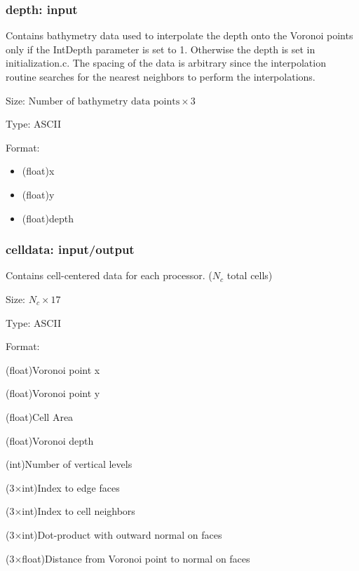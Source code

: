 \documentclass[12pt,oneside]{article}
\begin{document}
\subsubsection{depth: input}

Contains bathymetry data used to interpolate the depth onto the Voronoi points only
if the IntDepth parameter is set to 1.  Otherwise the depth is set in initialization.c.
The spacing of the data is arbitrary since the interpolation routine searches for the
nearest neighbors to perform the interpolations.
\begin{list}{}
\item Size: $\mbox{Number of bathymetry data points}\times 3$
\item Type: ASCII
\item Format: 
\begin{itemize}{}
\item (float)x
\item (float)y
\item (float)depth
\end{itemize}
\end{list}

\subsubsection{celldata: input/output}

Contains cell-centered data for each processor. ($N_c$ total cells)
\begin{list}{}
\item Size: $N_c\times 17$
\item Type: ASCII
\item Format:
\begin{list}{}
\item (float)Voronoi point x
\item (float)Voronoi point y
\item (float)Cell Area
\item (float)Voronoi depth
\item (int)Number of vertical levels
\item (3$\times$int)Index to edge faces
\item (3$\times$int)Index to cell neighbors
\item (3$\times$int)Dot-product with outward normal on faces
\item (3$\times$float)Distance from Voronoi point to normal on faces
\end{list}
\end{list}
\end{document}
